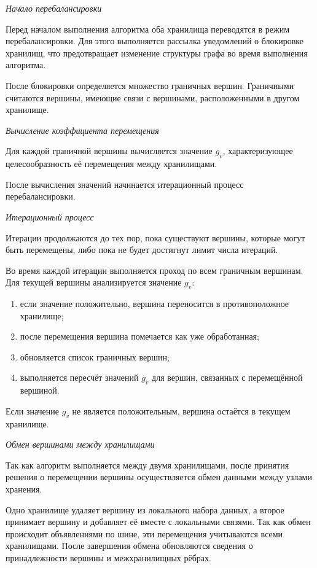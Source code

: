 \textit{Начало перебалансировки}

Перед началом выполнения алгоритма оба хранилища переводятся в режим перебалансировки. 
Для этого выполняется рассылка уведомлений о блокировке хранилищ, что предотвращает изменение структуры графа во время выполнения алгоритма.

После блокировки определяется множество граничных вершин. 
Граничными считаются вершины, имеющие связи с вершинами, расположенными в другом хранилище.

\textit{Вычисление коэффициента перемещения}

Для каждой граничной вершины вычисляется значение $g_v$, характеризующее целесообразность её перемещения между хранилищами.

После вычисления значений начинается итерационный процесс перебалансировки. 


\textit{Итерационный процесс}

Итерации продолжаются до тех пор, пока существуют вершины, которые могут быть перемещены, либо пока не будет достигнут лимит числа итераций.

Во время каждой итерации выполняется проход по всем граничным вершинам.
Для текущей вершины анализируется значение $g_v$:
\begin{enumerate}
    \item если значение положительно, вершина переносится в противоположное хранилище;
    \item после перемещения вершина помечается как уже обработанная;
    \item обновляется список граничных вершин;
    \item выполняется пересчёт значений $g_v$ для вершин, связанных с перемещённой вершиной.
\end{enumerate}

Если значение $g_v$ не является положительным, вершина остаётся в текущем хранилище.

\textit{Обмен вершинами между хранилищами}

Так как алгоритм выполняется между двумя хранилищами, после принятия решения о перемещении вершины осуществляется обмен данными между узлами хранения.

Одно хранилище удаляет вершину из локального набора данных, а второе принимает вершину и добавляет её вместе с локальными связями. Так как обмен происходит объявлениями по шине, эти перемещения учитываются всеми хранилищами.
После завершения обмена обновляются сведения о принадлежности вершины и межхранилищных рёбрах.

